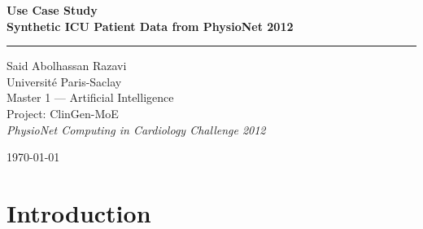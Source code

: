 \documentclass[12pt, a4paper]{article}
\begin{document}
\begin{titlepage}
    \centering
    \vspace*{3cm}

    {\Huge\bfseries Use Case Study\\[10pt]
    Synthetic ICU Patient Data from PhysioNet 2012}

    \vspace{1cm}
    \rule{0.5\linewidth}{0.4pt}
    \vspace{1cm}

    {\large Said Abolhassan Razavi}\\[6pt]
    {\normalsize Université Paris-Saclay}\\
    {\normalsize Master 1 --- Artificial Intelligence}\\[6pt]
    {\normalsize Project: ClinGen-MoE}\\[6pt]
    {\normalsize\textit{PhysioNet Computing in Cardiology Challenge 2012}}

    \vspace{2cm}

    \begin{abstract}
    \noindent
    This document presents three use cases for synthetic ICU patient data generated
    from the PhysioNet 2012 dataset using the ClinGen-MoE framework. Unlike
    standard synthetic data approaches that handle time-series measurements alone,
    PhysioNet 2012 provides two distinct modalities: static demographic descriptors
    (age, gender, ICU type, height, weight) and time-series clinical measurements
    (24 features over 48 hours). The generative model is conditioned on patient
    demographics, producing synthetic trajectories that are consistent with
    the patient's demographic profile. Three use cases are presented that
    exploit this multimodal structure for clinical AI applications:
    rare subgroup augmentation, ICU-type alert calibration, and
    privacy-safe inter-hospital data sharing.
    \end{abstract}

    \vfill
    {\small\today}
\end{titlepage}

\section*{Introduction}
\end{document}
